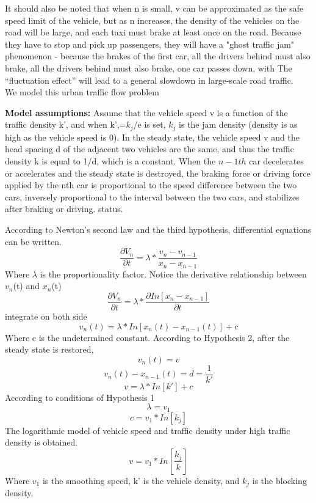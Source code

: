 It should also be noted that when n is small, v can be approximated as the safe speed limit of the vehicle, but as n increases, the density of the vehicles on the road will be large, and each taxi must brake at least once on the road. Because they have to stop and pick up passengers, they will have a "ghost traffic jam" phenomenon - because the brakes of the first car, all the drivers behind must also brake, all the drivers behind must also brake, one car passes down, with The “fluctuation effect” will lead to a general slowdown in large-scale road traffic.\\
We model this urban traffic flow problem\cite{lingjiang2005urban}

\textbf{Model assumptions:}
Assume that the vehicle speed v is a function of the traffic density k', and when k',=$k_j$/e is set, $k_j$ is the jam density (density is as high as the vehicle speed is 0).
 In the steady state, the vehicle speed v and the head spacing d of the adjacent two vehicles are the same, and thus the traffic density k is equal to 1/d, which is a constant.
When the $n-1th$ car decelerates or accelerates and the steady state is destroyed, the braking force or driving force applied by the nth car is proportional to the speed difference between the two cars, inversely proportional to the interval between the two cars, and stabilizes after braking or driving. status.

According to Newton's second law and the third hypothesis, differential equations can be written.
\begin{equation} \frac{\partial V_n}{\partial t} =\lambda  *\frac{v_n-v_{n-1}}{x_n-x_{n-1}} \end{equation}
Where $\lambda$ is the proportionality factor. Notice the derivative relationship between $v_n$(t) and $x_n$(t)
\begin{equation} \frac{\partial V_n}{\partial t} =\lambda *\frac{\partial In[x_n-x_{n-1}]}{\partial t}\end{equation}
integrate on both side
\begin{equation} v_n(t) =\lambda * In[x_n(t)-x_{n-1}(t)]+c\end{equation}
Where c is the undetermined constant.
According to Hypothesis 2, after the steady state is restored, 
\begin{equation} v_n(t) =v\end{equation}
\begin{equation} v_n(t) -x_{n-1}(t)=d=\frac{1}{k'}\end{equation}
\begin{equation} v =\lambda * In[k']+c\end{equation}
According to conditions of Hypothesis 1
\begin{equation} \lambda =v_1\end{equation}
\begin{equation} c =v_1 * In[k_j]\end{equation}
The logarithmic model of vehicle speed and traffic density under high traffic density is obtained.
\begin{equation} v =v_1 * In[\frac{k_j}{k}]\end{equation}
Where $v_1$ is the smoothing speed, k' is the vehicle density, and $k_j$ is the blocking density.
